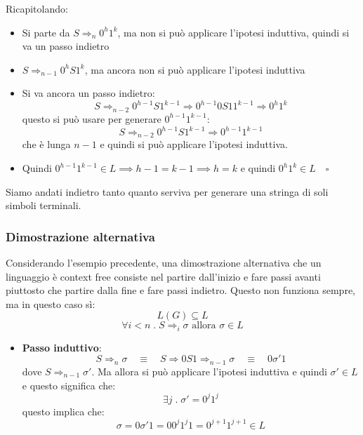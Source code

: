 \documentclass[a4paper]{article}
\begin{document}
\begin{example}
\begin{enumerate}
\begin{itemize}
          \vspace{1em}
          \noindent
          Ricapitolando:
          \begin{itemize}
            \item Si parte da \( S \Rightarrow_n 0^h 1^k \), ma non si può applicare
              l'ipotesi induttiva, quindi si va un passo indietro
            \item  \( S \Rightarrow_{n-1} 0^h S 1^k \), ma ancora non si può applicare l'ipotesi induttiva
            \item Si va ancora un passo indietro:
              \[
                S \Rightarrow_{n-2} 0^{h-1} S 1^{k-1} \Rightarrow 0^{h-1} 0 S 1 1^{k-1}
                \Rightarrow 0^h 1^k
              \] 
              questo si può usare per generare \( 0^{h-1} 1^{k-1} \):
              \[
                S \Rightarrow_{n-2} 0^{h-1} S 1^{k-1} \Rightarrow 0^{h-1} 1^{k-1}
              \] 
              che è lunga \( n-1 \) e quindi si può applicare l'ipotesi induttiva.
            \item Quindi \( 0^{h-1} 1^{k-1} \in L \implies h-1 = k-1 \implies h = k \)
              e quindi \( 0^h 1^k \in L \quad \square \)
          \end{itemize}
          Siamo andati indietro tanto quanto serviva per generare una stringa di soli
          simboli terminali.
      \end{itemize}
  \end{enumerate}
\end{example}

\subsubsection{Dimostrazione alternativa}
\begin{example}
  Considerando l'esempio precedente, una dimostrazione alternativa che un linguaggio è context free consiste
  nel partire dall'inizio e fare passi avanti piuttosto che partire dalla fine e fare passi indietro.
  Questo non funziona sempre, ma in questo caso sì:
  \[
    L(G) \subseteq L
  \] 
  \[
    \forall i < n \;.\; S \Rightarrow_i \sigma \text{ allora } \sigma \in L
  \] 
  \begin{itemize}
    \item \textbf{Passo induttivo}:
      \[
        S \Rightarrow_n \sigma \quad\equiv\quad S \Rightarrow 0 S 1 \Rightarrow_{n-1} \sigma
        \quad\equiv\quad 0 \sigma' 1
      \] 
      dove \( S \Rightarrow_{n-1} \sigma' \). Ma allora si può applicare l'ipotesi induttiva
      e quindi \( \sigma' \in L \) e questo significa che:
      \[
        \exists j \;.\; \sigma' = 0^{j} 1^{j}
      \] 
      questo implica che:
      \[
        \sigma = 0 \sigma' 1 = 0 0^{j} 1^{j} 1 = 0^{j+1} 1^{j+1} \in L
      \] 
  \end{itemize}
\end{example}
\end{document}
